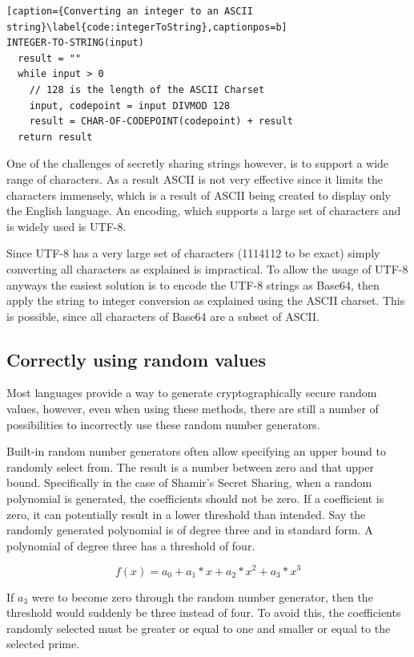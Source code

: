 \begin{lstlisting}[caption={Converting an integer to an ASCII string}\label{code:integerToString},captionpos=b]
INTEGER-TO-STRING(input)
  result = ""
  while input > 0
    // 128 is the length of the ASCII Charset
    input, codepoint = input DIVMOD 128
    result = CHAR-OF-CODEPOINT(codepoint) + result
  return result
\end{lstlisting}

One of the challenges of secretly sharing strings however, is to support a wide
range of characters. As a result ASCII is not very effective since it limits
the characters immensely, which is a result of ASCII being created to display
only the English language. An encoding, which supports a large set of
characters and is widely used is UTF-8.

Since UTF-8 has a very large set of characters (1114112 to be exact) simply
converting all characters as explained is impractical. To allow the usage of
UTF-8 anyways the easiest solution is to encode the UTF-8 strings as Base64,
then apply the string to integer conversion as explained using the ASCII
charset. This is possible, since all characters of Base64 are a subset of
ASCII. \cite{unicode_spec}

\subsection{Correctly using random values}

Most languages provide a way to generate cryptographically secure random
values, however, even when using these methods, there are still a number of
possibilities to incorrectly use these random number generators.

Built-in random number generators often allow specifying an upper bound to
randomly select from. The result is a number between zero and that upper bound.
Specifically in the case of Shamir's Secret Sharing, when a random polynomial
is generated, the coefficients should not be zero. If a coefficient is zero, it
can potentially result in a lower threshold than intended. Say the randomly
generated polynomial is of degree three and in standard form. A polynomial of
degree three has a threshold of four.

$$f(x) = a_0 + a_1 * x + a_2 * x^2 + a_3 * x^3$$

If $a_3$ were to become zero through the random number generator, then the
threshold would suddenly be three instead of four. To avoid this, the
coefficients randomly selected must be greater or equal to one and smaller or
equal to the selected prime.

